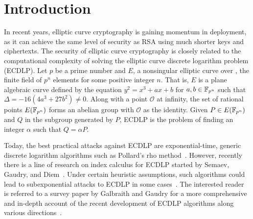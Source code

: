 %
%

\section{Introduction}
%
In recent years, elliptic curve cryptography is gaining momentum in
deployment, as it can achieve the same level of security as RSA using
much shorter keys and ciphertexts.
%
The security of elliptic curve cryptography is closely related to the
computational complexity of solving the elliptic curve discrete
logarithm problem (ECDLP).
%
Let $p$ be a prime number and $E$, a nonsingular elliptic curve over
, the finite field of $p^n$ elements for some positive integer
$n$.
%
That is, $E$ is a plane algebraic curve defined by the equation
$y^2=x^3+ax+b$ for $a,b\in\mathbb F_{p^n}$ such that
$\Delta=-16(4a^3+27b^2)\neq 0$.
%
Along with a point $\mathcal O$ at infinity, the set of rational
points $E(\mathbb F_{p^n})$ forms an abelian group with $\mathcal O$ as the
identity.
%
Given $P\in E(\mathbb F_{p^n})$ and $Q$ in the subgroup generated by $P$,
ECDLP is the problem of finding an integer $\alpha$ such that
$Q=\alpha P$.

Today, the best practical attacks against ECDLP are exponential-time,
generic discrete logarithm algorithms such as Pollard's rho
method~\cite{1978-pollard-kangaroo}.
%
However, recently there is a line of research on index calculus for
ECDLP started by Semaev, Gaudry, and
Diem~\cite{DBLP:journals/iacr/Semaev04,DBLP:journals/jsc/Gaudry09,DBLP:journals/moc/Diem11}.
%
Under certain heuristic assumptions, such algorithms could lead to
subexponential attacks to ECDLP in some
cases~\cite{DBLP:conf/eurocrypt/FaugerePPR12,DBLP:journals/iacr/PetitQ12,DBLP:conf/iwsec/HuangPST13}.
%
The interested reader is referred to a survey paper by Galbraith and
Gaudry for a more comprehensive and in-depth account of the recent
development of ECDLP algorithms along various
directions~\cite{DBLP:journals/dcc/GalbraithG16}.

